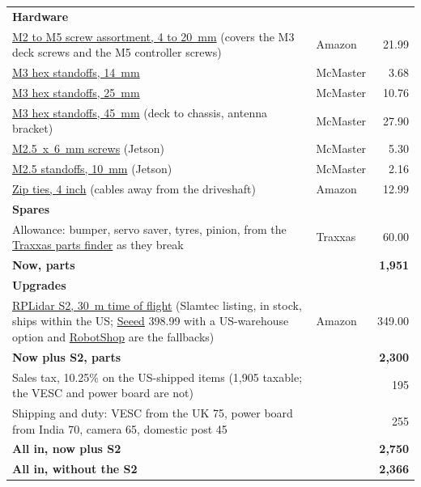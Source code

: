\documentclass[11pt,a4paper]{article}
\begin{document}
\begin{longtable}{p{11.6cm}lr}
\multicolumn{3}{l}{\textbf{Hardware}} \\
\href{https://www.amazon.com/dp/B0FGX9JGC5}{M2 to M5 screw assortment, 4 to 20~mm} (covers the M3 deck screws and the M5 controller screws) & Amazon & 21.99 \\
\href{https://www.mcmaster.com/94868A009}{M3 hex standoffs, 14~mm} & McMaster & 3.68 \\
\href{https://www.mcmaster.com/94868A013}{M3 hex standoffs, 25~mm} & McMaster & 10.76 \\
\href{https://www.mcmaster.com/94868A190}{M3 hex standoffs, 45~mm} (deck to chassis, antenna bracket) & McMaster & 27.90 \\
\href{https://www.mcmaster.com/94500A213/}{M2.5~x~6~mm screws} (Jetson) & McMaster & 5.30 \\
\href{https://www.mcmaster.com/95947A005/}{M2.5 standoffs, 10~mm} (Jetson) & McMaster & 2.16 \\
\href{https://www.amazon.com/dp/B078Y7MH6Z}{Zip ties, 4 inch} (cables away from the driveshaft) & Amazon & 12.99 \\
\multicolumn{3}{l}{\textbf{Spares}} \\
Allowance: bumper, servo saver, tyres, pinion, from the \href{https://traxxas.com/products/parts}{Traxxas parts finder} as they break & Traxxas & 60.00 \\
\midrule
\textbf{Now, parts} & & \textbf{1{,}951} \\
\midrule
\multicolumn{3}{l}{\textbf{Upgrades}} \\
\href{https://www.amazon.com/dp/B0G4M3J1L8}{RPLidar S2, 30~m time of flight} (Slamtec listing, in stock, ships within the US; \href{https://www.seeedstudio.com/RPLiDAR-S2-Low-Cost-360-Degree-Laser-Range-Scanner-30M-Range-p-5198.html}{Seeed} 398.99 with a US-warehouse option and \href{https://www.robotshop.com/products/rplidar-s2-360-laser-scanner-30-m}{RobotShop} are the fallbacks) & Amazon & 349.00 \\
\midrule
\textbf{Now plus S2, parts} & & \textbf{2{,}300} \\
Sales tax, 10.25\% on the US-shipped items (1{,}905 taxable; the VESC and power board are not) & & 195 \\
Shipping and duty: VESC from the UK 75, power board from India 70, camera 65, domestic post 45 & & 255 \\
\textbf{All in, now plus S2} & & \textbf{2{,}750} \\
\textbf{All in, without the S2} & & \textbf{2{,}366} \\
\bottomrule
\end{longtable}
\normalsize
\end{document}
